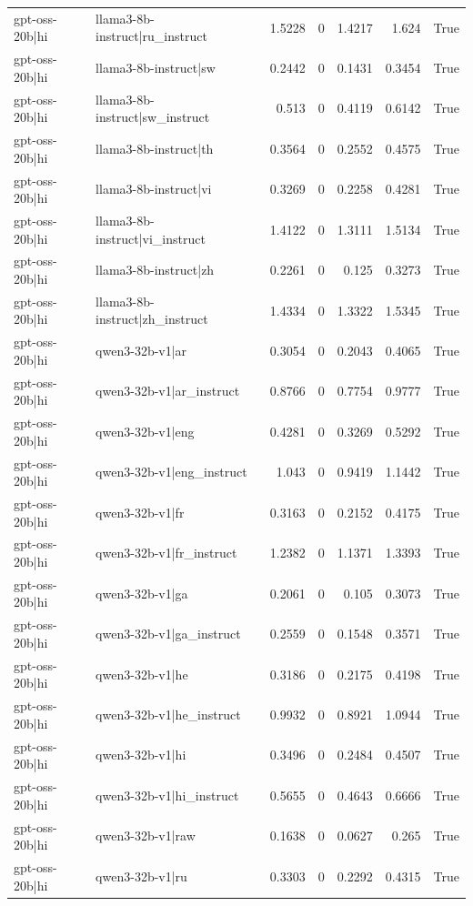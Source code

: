 \begin{table}
\begin{tabular}{l l r r r r l}
gpt-oss-20b|hi & llama3-8b-instruct|ru_instruct & 1.5228 & 0 & 1.4217 & 1.624 & True \\
gpt-oss-20b|hi & llama3-8b-instruct|sw & 0.2442 & 0 & 0.1431 & 0.3454 & True \\
gpt-oss-20b|hi & llama3-8b-instruct|sw_instruct & 0.513 & 0 & 0.4119 & 0.6142 & True \\
gpt-oss-20b|hi & llama3-8b-instruct|th & 0.3564 & 0 & 0.2552 & 0.4575 & True \\
gpt-oss-20b|hi & llama3-8b-instruct|vi & 0.3269 & 0 & 0.2258 & 0.4281 & True \\
gpt-oss-20b|hi & llama3-8b-instruct|vi_instruct & 1.4122 & 0 & 1.3111 & 1.5134 & True \\
gpt-oss-20b|hi & llama3-8b-instruct|zh & 0.2261 & 0 & 0.125 & 0.3273 & True \\
gpt-oss-20b|hi & llama3-8b-instruct|zh_instruct & 1.4334 & 0 & 1.3322 & 1.5345 & True \\
gpt-oss-20b|hi & qwen3-32b-v1|ar & 0.3054 & 0 & 0.2043 & 0.4065 & True \\
gpt-oss-20b|hi & qwen3-32b-v1|ar_instruct & 0.8766 & 0 & 0.7754 & 0.9777 & True \\
gpt-oss-20b|hi & qwen3-32b-v1|eng & 0.4281 & 0 & 0.3269 & 0.5292 & True \\
gpt-oss-20b|hi & qwen3-32b-v1|eng_instruct & 1.043 & 0 & 0.9419 & 1.1442 & True \\
gpt-oss-20b|hi & qwen3-32b-v1|fr & 0.3163 & 0 & 0.2152 & 0.4175 & True \\
gpt-oss-20b|hi & qwen3-32b-v1|fr_instruct & 1.2382 & 0 & 1.1371 & 1.3393 & True \\
gpt-oss-20b|hi & qwen3-32b-v1|ga & 0.2061 & 0 & 0.105 & 0.3073 & True \\
gpt-oss-20b|hi & qwen3-32b-v1|ga_instruct & 0.2559 & 0 & 0.1548 & 0.3571 & True \\
gpt-oss-20b|hi & qwen3-32b-v1|he & 0.3186 & 0 & 0.2175 & 0.4198 & True \\
gpt-oss-20b|hi & qwen3-32b-v1|he_instruct & 0.9932 & 0 & 0.8921 & 1.0944 & True \\
gpt-oss-20b|hi & qwen3-32b-v1|hi & 0.3496 & 0 & 0.2484 & 0.4507 & True \\
gpt-oss-20b|hi & qwen3-32b-v1|hi_instruct & 0.5655 & 0 & 0.4643 & 0.6666 & True \\
gpt-oss-20b|hi & qwen3-32b-v1|raw & 0.1638 & 0 & 0.0627 & 0.265 & True \\
gpt-oss-20b|hi & qwen3-32b-v1|ru & 0.3303 & 0 & 0.2292 & 0.4315 & True \\

\end{tabular}
\end{table}
